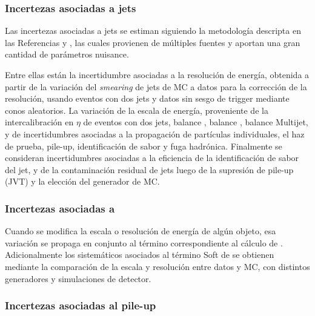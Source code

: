 \subsubsection{Incertezas asociadas a jets}

Las incertezas asociadas a jets se estiman siguiendo la metodología descripta en las Referencias \cite{PERF-2011-03} y \cite{ATLAS-CONF-2015-037}, las cuales provienen de múltiples fuentes y aportan una gran cantidad de parámetros nuisance. 


Entre ellas están la incertidumbre asociadas a la resolución de energía, obtenida a partir de la variación del \textit{smearing} de jets de MC a datos para la corrección de la resolución, usando eventos con dos jets y datos sin sesgo de trigger mediante conos aleatorios.
La variación de la escala de energía, proveniente de la intercalibración en $\eta$ de eventos con dos jets, balance \zj, balance \phj, balance Multijet, y de incertidumbres asociadas a la propagación de partículas individuales, el haz de prueba, pile-up, identificación de sabor y fuga hadrónica.
Finalmente se consideran incertidumbres asociadas a la eficiencia de la identificación de sabor del jet, y de la contaminación residual de jets luego de la supresión de pile-up (JVT) y la elección del generador de MC.


\subsubsection{Incertezas asociadas a \met}

Cuando se modifica la escala o resolución de energía de algún objeto, esa variación se propaga en conjunto al término correspondiente al cálculo de \met. Adicionalmente los sistemáticos asociados al término Soft de \met se obtienen mediante la comparación de la escala y resolución entre datos y MC, con distintos generadores y simulaciones de detector.

\subsubsection{Incertezas asociadas al pile-up}

